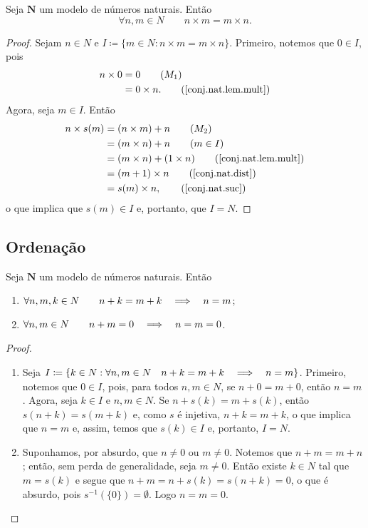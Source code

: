 \begin{teo}
	Seja $\bm N$ um modelo de números naturais. Então
	\begin{equation*}
	\forall n,m \in N \qquad n \times m = m \times n.
	\end{equation*}
\end{teo}
\begin{proof}
	Sejam $n \in N$ e $I \coloneqq \{m \in N:n \times m=m \times n\}$. Primeiro, notemos que $0 \in I$, pois
	\begin{align*}
	n \times 0 &= 0 													\tag{$M_1$} \\
		&= 0 \times n.													\tag{\ref{conj.nat.lem.mult}}
	\end{align*}
Agora, seja $m \in I$. Então
	\begin{align*}
	n \times s(m) &= (n \times m) + n							\tag{$M_2$} \\
		&= (m \times n) + n											\tag{$m \in I$} \\
		&= (m \times n) + (1 \times n)							\tag{\ref{conj.nat.lem.mult}} \\
		&= (m +1) \times n											\tag{\ref{conj.nat.dist}} \\
		&= s(m) \times n,												\tag{\ref{conj.nat.suc}}
	\end{align*}
o que implica que $s(m) \in I$ e, portanto, que $I=N$.
\end{proof}

\subsection{Ordenação}

\begin{lema}
	Seja $\bm N$ um modelo de números naturais. Então
	\begin{enumerate}
	\item $\forall n,m,k \in N \qquad n+k=m+k \quad \Longrightarrow \quad n=m$;
	\item $\forall n,m \in N \qquad n+m = 0 \quad \Longrightarrow \quad n=m=0$.
	\end{enumerate}
\end{lema}
\begin{proof}
	\begin{enumerate}
	\item Seja $I \coloneqq \{k \in N: \forall n,m \in N \quad n+k=m+k \quad \Longrightarrow \quad n=m\}$. Primeiro, notemos que $0 \in I$, pois, para todos $n,m \in N$, se $n+0=m+0$, então $n=m$. Agora, seja $k \in I$ e $n,m \in N$. Se $n+s(k)=m+s(k)$, então $s(n+k)=s(m+k)$ e, como $s$ é injetiva, $n+k=m+k$, o que implica que $n=m$ e, assim, temos que $s(k) \in I$ e, portanto, $I=N$.
	
	\item Suponhamos, por absurdo, que $n \neq 0$ ou $m \neq 0$. Notemos que $n+m=m+n$; então, sem perda de generalidade, seja $m \neq 0$. Então existe $k \in N$ tal que $m=s(k)$ e segue que $n+m=n+s(k)=s(n+k)=0$, o que é absurdo, pois $s^{-1}(\{0\})=\emptyset$. Logo $n=m=0$.
	\end{enumerate}
\end{proof}

